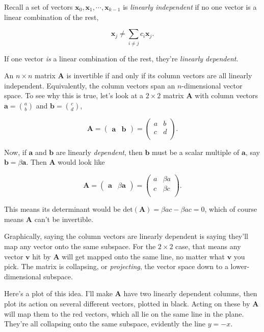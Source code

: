 \documentclass[
  letterpaper,
  DIV=11,
  numbers=noendperiod]{scrreprt}
\begin{document}
Recall a set of vectors
\(\mathbf{x}_0, \mathbf{x}_1, \cdots, \mathbf{x}_{k-1}\) is
\emph{linearly independent} if no one vector is a linear combination of
the rest,

\[\mathbf{x}_j \neq \sum_{i \neq j} c_i \mathbf{x}_j.\]

If one vector \emph{is} a linear combination of the rest, they're
\emph{linearly dependent}.

An \(n \times n\) matrix \(\mathbf{A}\) is invertible if and only if its
column vectors are all linearly independent. Equivalently, the column
vectors span an \(n\)-dimensional vector space. To see why this is true,
let's look at a \(2 \times 2\) matrix \(\mathbf{A}\) with column vectors
\(\mathbf{a}=\binom{a}{b}\) and \(\mathbf{b}=\binom{c}{d}\),

\[
\mathbf{A} = \begin{pmatrix} \mathbf{a} & \mathbf{b} \end{pmatrix} = 
\begin{pmatrix}
a & b \\
c & d \\
\end{pmatrix}.
\]

Now, if \(\mathbf{a}\) and \(\mathbf{b}\) are linearly \emph{dependent},
then \(\mathbf{b}\) must be a scalar multiple of \(\mathbf{a}\), say
\(\mathbf{b} = \beta \mathbf{a}\). Then \(\mathbf{A}\) would look like

\[
\mathbf{A} = \begin{pmatrix} \mathbf{a} & \beta \mathbf{a} \end{pmatrix} = 
\begin{pmatrix}
a & \beta a \\
c & \beta c \\
\end{pmatrix}.
\]

This means its determinant would be
\(\text{det}(\mathbf{A}) = \beta ac - \beta ac = 0\), which of course
means \(\mathbf{A}\) can't be invertible.

Graphically, saying the column vectors are linearly dependent is saying
they'll map any vector onto the same subspace. For the \(2 \times 2\)
case, that means any vector \(\mathbf{v}\) hit by \(\mathbf{A}\) will
get mapped onto the same line, no matter what \(\mathbf{v}\) you pick.
The matrix is collapsing, or \emph{projecting}, the vector space down to
a lower-dimensional subspace.

Here's a plot of this idea. I'll make \(\mathbf{A}\) have two linearly
dependent columns, then plot its action on several different vectors,
plotted in black. Acting on these by \(\mathbf{A}\) will map them to the
red vectors, which all lie on the same line in the plane. They're all
collapsing onto the same subspace, evidently the line \(y=-x\).
\end{document}
